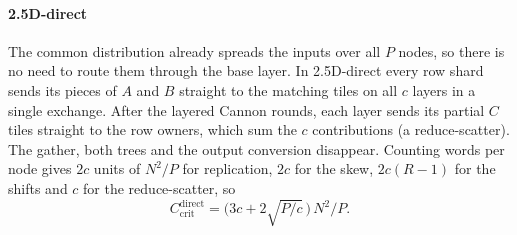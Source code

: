 \documentclass[11pt,a4paper]{article}
\newcommand{\Ccrit}{C_{\mathrm{crit}}}
\begin{document}
\paragraph{2.5D-direct}
The common distribution already spreads the inputs over all $P$ nodes, so there is no need to route them
through the base layer. In 2.5D-direct every row shard sends its pieces of $A$ and $B$ straight to the
matching tiles on all $c$ layers in a single exchange. After the layered Cannon rounds, each layer sends
its partial $C$ tiles straight to the row owners, which sum the $c$ contributions (a reduce-scatter). The
gather, both trees and the output conversion disappear. Counting words per node gives $2c$ units of
$N^2/P$ for replication, $2c$ for the skew, $2c(R-1)$ for the shifts and $c$ for the reduce-scatter, so
\begin{equation}
\Ccrit^{\text{direct}} = \big(3c + 2\sqrt{P/c}\,\big)\,N^2/P .
\label{eq:direct}
\end{equation}
\end{document}
